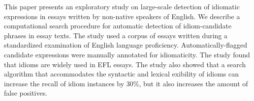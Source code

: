 This paper presents an exploratory study on large-scale detection of idiomatic expressions in essays written by non-native speakers of English. We describe a computational search procedure for automatic detection of idiom-candidate phrases in essay texts. The study used a corpus of essays written during a standardized examination of English language proficiency. Automatically-flagged candidate expressions were manually annotated for idiomaticity. The study found that idioms are widely used in EFL essays. The study also showed that a search algorithm that accommodates the syntactic and lexical exibility of idioms can increase the recall of idiom instances by 30\%, but it also increases the amount of false positives.
